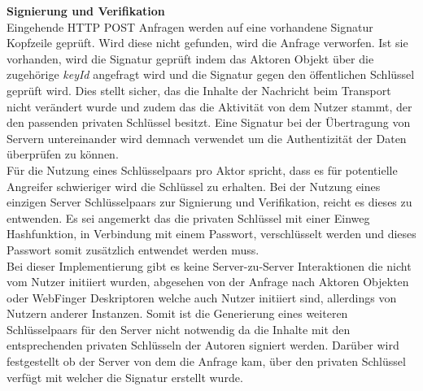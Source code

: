 \begingroup
	\fontsize{18pt}{12pt}\selectfont
	\textbf{Signierung und Verifikation}
	\vspace{4pt}
\endgroup\\
Eingehende HTTP POST Anfragen werden auf eine vorhandene Signatur Kopfzeile geprüft. Wird diese nicht gefunden, wird die Anfrage verworfen. Ist sie vorhanden, wird die Signatur geprüft indem das Aktoren Objekt über die zugehörige \textit{keyId} angefragt wird und die Signatur gegen den öffentlichen Schlüssel geprüft wird. Dies stellt sicher, das die Inhalte der Nachricht beim Transport nicht verändert wurde und zudem das die Aktivität von dem Nutzer stammt, der den passenden privaten Schlüssel besitzt. Eine Signatur bei der Übertragung von Servern untereinander wird demnach verwendet um die Authentizität der Daten überprüfen zu können.\\

Für die Nutzung eines Schlüsselpaars pro Aktor spricht, dass es für potentielle Angreifer schwieriger wird die Schlüssel zu erhalten. Bei der Nutzung eines einzigen Server Schlüsselpaars zur Signierung und Verifikation, reicht es dieses zu entwenden. Es sei angemerkt das die privaten Schlüssel mit einer Einweg Hashfunktion, in Verbindung mit einem Passwort, verschlüsselt werden und dieses Passwort somit zusätzlich entwendet werden muss.\\

Bei dieser Implementierung gibt es keine Server-zu-Server Interaktionen die nicht vom Nutzer initiiert wurden, abgesehen von der Anfrage nach Aktoren Objekten oder WebFinger Deskriptoren welche auch Nutzer initiiert sind, allerdings von Nutzern anderer Instanzen. Somit ist die Generierung eines weiteren Schlüsselpaars für den Server nicht notwendig da die Inhalte mit den entsprechenden privaten Schlüsseln der Autoren signiert werden. Darüber wird festgestellt ob der Server von dem die Anfrage kam, über den privaten Schlüssel verfügt mit welcher die Signatur erstellt wurde.